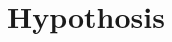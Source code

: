 \documentclass[paper=a4, fontsize=10pt, font=arial]{scrartcl} %
\numberwithin{equation}{section} %
\numberwithin{figure}{section} %
\numberwithin{table}{section} %
\begin{document}




\newpage

\section{Hypothosis}
\end{document}

